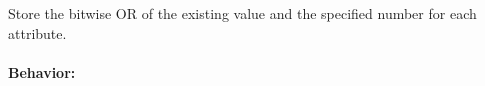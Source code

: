Store the bitwise OR of the existing value and the specified number for each
attribute.

\paragraph{Behavior:}
\begin{itemize}[noitemsep]

\end{itemize}
